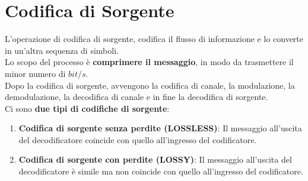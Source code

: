 \documentclass{article}
\begin{document}
\newpage
\section{Codifica di Sorgente}
L'operazione di codifica di sorgente, codifica il flusso di informazione e lo converte in un'altra sequenza di simboli.\\
Lo scopo del processo è \textbf{comprimere il messaggio}, in modo da trasmettere il minor numero di $bit/s$.\\
Dopo la codifica di sorgente, avvengono la codifica di canale, la modulazione, la demodulazione, la decodifica di canale e in fine la decodifica di sorgente.\\
Ci sono \textbf{due tipi di codifiche di sorgente}:
\begin{enumerate}
	\item \textbf{Codifica di sorgente senza perdite (LOSSLESS)}: Il messaggio all'uscita del decodificatore coincide con quello all'ingresso del codificatore.
	\item \textbf{Codifica di sorgente con perdite (LOSSY)}: Il messaggio all'uscita del decodificatore è simile ma non coincide con quello all'ingresso del codificatore.
\end{enumerate}
\end{document}
